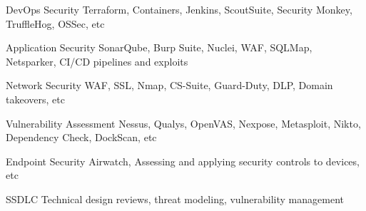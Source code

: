 
\begin{cvskills}

  \cvskill
    {DevOps Security} %
    {Terraform, Containers, Jenkins, ScoutSuite, Security Monkey, TruffleHog, OSSec, etc} %

  \cvskill
    {Application Security} %
    {SonarQube, Burp Suite, Nuclei, WAF, SQLMap, Netsparker, CI/CD pipelines and exploits } %

  \cvskill
    {Network Security} %
    {WAF, SSL, Nmap, CS-Suite, Guard-Duty, DLP, Domain takeovers, etc } %

  \cvskill
    {Vulnerability Assessment } %
    {Nessus, Qualys, OpenVAS, Nexpose, Metasploit, Nikto, Dependency Check, DockScan, etc } %


  \cvskill
    {Endpoint Security} %
    {Airwatch, Assessing and applying security controls to devices, etc } %

  \cvskill
    {SSDLC}
    {Technical design reviews, threat modeling, vulnerability management}

\end{cvskills}
